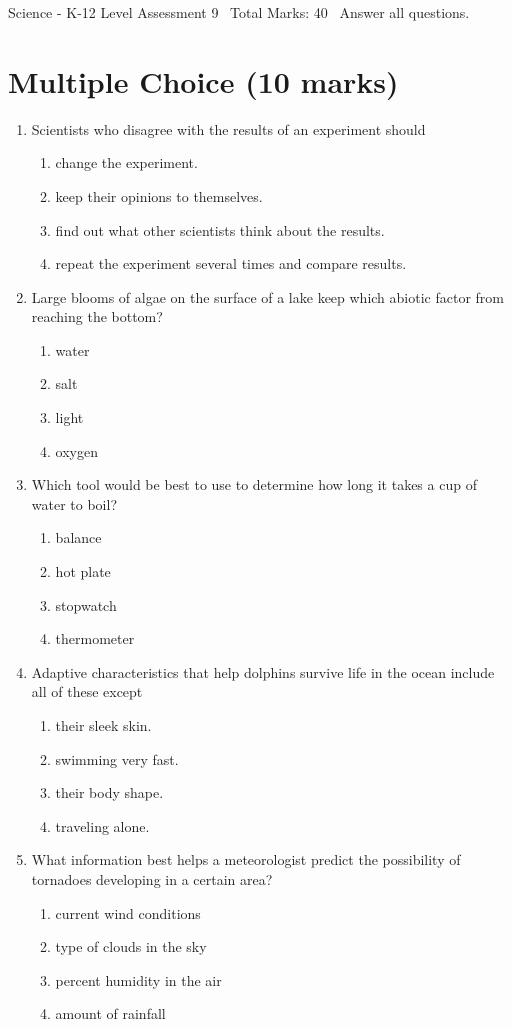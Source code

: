\documentclass[12pt]{article}
\begin{document}
\begin{center}
Science - K-12 Level Assessment 9 \
Total Marks: 40 \
Answer all questions.
\end{center}

\section*{Multiple Choice (10 marks)}
\begin{enumerate}[label=\arabic*.]
\item Scientists who disagree with the results of an experiment should
\begin{enumerate}[label=(\alph*)]
    \item change the experiment.
    \item keep their opinions to themselves.
    \item find out what other scientists think about the results.
    \item repeat the experiment several times and compare results.
\end{enumerate}
\item Large blooms of algae on the surface of a lake keep which abiotic factor from reaching the bottom?
\begin{enumerate}[label=(\alph*)]
    \item water
    \item salt
    \item light
    \item oxygen
\end{enumerate}
\item Which tool would be best to use to determine how long it takes a cup of water to boil?
\begin{enumerate}[label=(\alph*)]
    \item balance
    \item hot plate
    \item stopwatch
    \item thermometer
\end{enumerate}
\item Adaptive characteristics that help dolphins survive life in the ocean include all of these except
\begin{enumerate}[label=(\alph*)]
    \item their sleek skin.
    \item swimming very fast.
    \item their body shape.
    \item traveling alone.
\end{enumerate}
\item What information best helps a meteorologist predict the possibility of tornadoes developing in a certain area?
\begin{enumerate}[label=(\alph*)]
    \item current wind conditions
    \item type of clouds in the sky
    \item percent humidity in the air
    \item amount of rainfall
\end{enumerate}
\end{enumerate}
\end{document}

